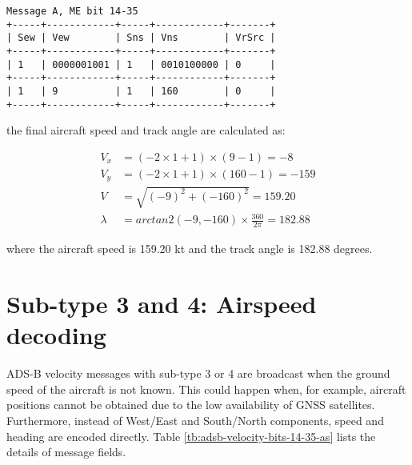 \begin{verbatim}
Message A, ME bit 14-35
+-----+------------+-----+------------+-------+
| Sew | Vew        | Sns | Vns        | VrSrc |
+-----+------------+-----+------------+-------+
| 1   | 0000001001 | 1   | 0010100000 | 0     |
+-----+------------+-----+------------+-------+
| 1   | 9          | 1   | 160        | 0     |
+-----+------------+-----+------------+-------+
\end{verbatim}

the final aircraft speed and track angle are calculated as:

\begin{align}
  V_x &= (-2 \times 1 + 1) \times (9 - 1)  = -8 \\
  V_y &= (-2 \times 1 + 1) \times (160 - 1) = -159 \\
  V &= \sqrt{(-9)^2+ (-160)^2} = 159.20 \\
  \lambda &= arctan2(-9, -160) \times \frac{360}{2\pi} = 182.88
\end{align}

where the aircraft speed is 159.20 kt and the track angle is 182.88 degrees.


\section{Sub-type 3 and 4: Airspeed decoding}

ADS-B velocity messages with sub-type 3 or 4 are broadcast when the ground speed of the aircraft is not known. This could happen when, for example, aircraft positions cannot be obtained due to the low availability of GNSS satellites. Furthermore, instead of West/East and South/North components, speed and heading are encoded directly. Table \ref{tb:adsb-velocity-bits-14-35-as} lists the details of message fields.

